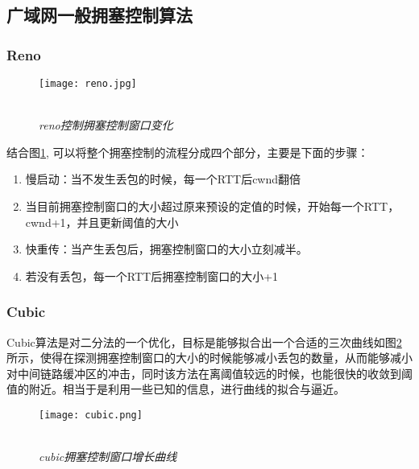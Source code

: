 \documentclass[a4paper, 12pt, UTF8]{ctexart}
\begin{document}
\subsection{广域网一般拥塞控制算法}

\subsubsection{Reno}
\begin{figure}[H]
	\centering \texttt{[image: reno.jpg]}
	\\ \hspace*{\fill} \\
	\caption{\em reno控制拥塞控制窗口变化}
	\label{fig:reno algorithm}
\end{figure}
\par 结合图\ref{fig:reno algorithm}, 可以将整个拥塞控制的流程分成四个部分，主要是下面的步骤：
\begin{enumerate}
	\item 慢启动：当不发生丢包的时候，每一个RTT后cwnd翻倍
	\item 当目前拥塞控制窗口的大小超过原来预设的定值的时候，开始每一个RTT，cwnd+1，并且更新阈值的大小
	\item 快重传：当产生丢包后，拥塞控制窗口的大小立刻减半。
	\item 若没有丢包，每一个RTT后拥塞控制窗口的大小+1
\end{enumerate}


\subsubsection{Cubic}
\par Cubic算法\cite{10.1145/1400097.1400105}是对二分法的一个优化，目标是能够拟合出一个合适的三次曲线如图\ref{fig:cubics algorithm}所示，使得在探测拥塞控制窗口的大小的时候能够减小丢包的数量，从而能够减小对中间链路缓冲区的冲击，同时该方法在离阈值较远的时候，也能很快的收敛到阈值的附近。相当于是利用一些已知的信息，进行曲线的拟合与逼近。

\begin{figure}[H]
	\centering \texttt{[image: cubic.png]}
	\\ \hspace*{\fill} \\
	\caption{\em cubic拥塞控制窗口增长曲线}
	\label{fig:cubics algorithm}
\end{figure}
\end{document}
